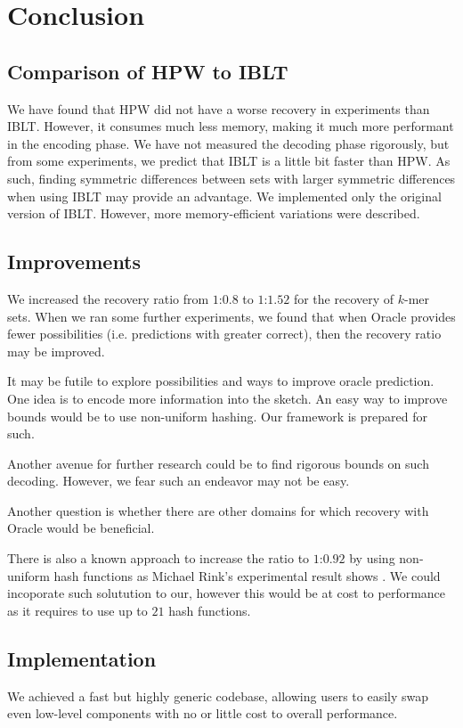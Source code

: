\chapter*{Conclusion}
\section{Comparison of HPW to IBLT}
We have found that HPW did not have a worse recovery in experiments than IBLT. However, it consumes much less memory, making it much more performant in the encoding phase. We have not measured the decoding phase rigorously, but from some experiments, we predict that IBLT is a little bit faster than HPW. As such, finding symmetric differences between sets with larger symmetric differences when using IBLT may provide an advantage. We implemented only the original version of IBLT. However, more memory-efficient variations were described. 

\section*{Improvements}
We increased the recovery ratio from $1$:$0.8$ to $1$:$1.52$ for the recovery of $k$-mer sets. When we ran some further experiments, we found that when Oracle provides fewer possibilities (i.e. predictions with greater correct), then the recovery ratio may be improved.

It may be futile to explore possibilities and ways to improve oracle prediction. One idea is to encode more information into the sketch. An easy way to improve bounds would be to use non-uniform hashing. Our framework is prepared for such.

Another avenue for further research could be to find rigorous bounds on such decoding. However, we fear such an endeavor may not be easy.

Another question is whether there are other domains for which recovery with Oracle would be beneficial.

There is also a known approach to increase the ratio to $1$:$0.92$ by using non-uniform hash functions as Michael Rink's experimental result shows \cite{DBLP:journals/corr/abs-1204-2131}. We could incoporate such solutution to our, however this would be at cost to performance as it requires to use up to $21$ hash functions.


\section*{Implementation}
We achieved a fast but highly generic codebase, allowing users to easily swap even low-level components with no or little cost to overall performance. 

